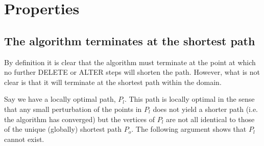 \section{Properties}

%
%
%
%
%
\subsection{The algorithm terminates at the shortest path}

By definition it is clear that the algorithm must terminate at the point at which no further DELETE or ALTER steps will shorten the path. However, what is not clear is that it will terminate at the shortest path within the domain.

Say we have a locally optimal path, $P_l$. This path is locally optimal in the sense that any small perturbation of the points in $P_l$ does not yield a shorter path (i.e. the algorithm has converged) but the vertices of $P_l$ are not all identical to those of the unique (globally) shortest path $P_o$. The following argument shows that $P_l$ cannot exist. 

